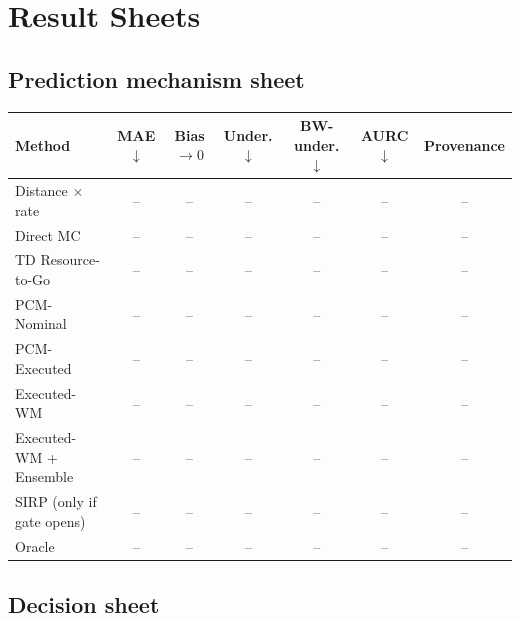 \section{Result Sheets}
\label{app:result-sheets}

\subsection{Prediction mechanism sheet}

\begin{center}
\centering
\small
{}
\begin{tabular}{lcccccc}
\toprule
Method & MAE$\downarrow$ & Bias$\to0$ & Under.$\downarrow$ & BW-under.$\downarrow$ & AURC$\downarrow$ & Provenance \\
\midrule
Distance $\times$ rate & -- & -- & -- & -- & -- & -- \\
Direct MC & -- & -- & -- & -- & -- & -- \\
TD Resource-to-Go & -- & -- & -- & -- & -- & -- \\
PCM-Nominal & -- & -- & -- & -- & -- & -- \\
PCM-Executed & -- & -- & -- & -- & -- & -- \\
Executed-WM & -- & -- & -- & -- & -- & -- \\
Executed-WM + Ensemble & -- & -- & -- & -- & -- & -- \\
SIRP (only if gate opens) & -- & -- & -- & -- & -- & -- \\
Oracle & -- & -- & -- & -- & -- & -- \\
\bottomrule
\end{tabular}
\end{center}

\newpage
\subsection{Decision sheet}

